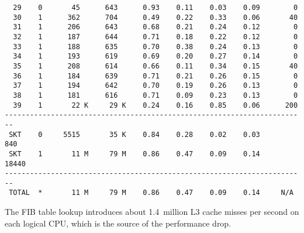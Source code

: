 \begin{lstlisting}
  29    0       45      643      0.93    0.11    0.03    0.09        0
  30    1      362      704      0.49    0.22    0.33    0.06       40
  31    1      206      643      0.68    0.21    0.24    0.12        0
  32    1      187      644      0.71    0.18    0.22    0.12        0
  33    1      188      635      0.70    0.38    0.24    0.13        0
  34    1      193      619      0.69    0.20    0.27    0.14        0
  35    1      208      614      0.66    0.11    0.34    0.15       40
  36    1      184      639      0.71    0.21    0.26    0.15        0
  37    1      194      642      0.70    0.19    0.26    0.13        0
  38    1      181      616      0.71    0.09    0.23    0.13        0
  39    1       22 K     29 K    0.24    0.16    0.85    0.06      200
------------------------------------------------------------------------
 SKT    0     5515       35 K    0.84    0.28    0.02    0.03       840
 SKT    1       11 M     79 M    0.86    0.47    0.09    0.14     18440
------------------------------------------------------------------------
 TOTAL  *       11 M     79 M    0.86    0.47    0.09    0.14     N/A
\end{lstlisting}
The FIB table lookup introduces about 1.4~million L3 cache misses per second on each logical CPU,
which is the source of the performance drop.
